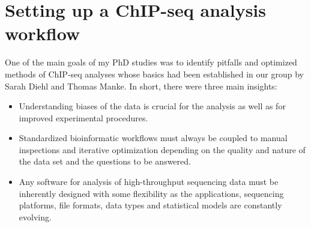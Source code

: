 \section{Setting up a ChIP-seq analysis workflow}
One of the main goals of my PhD studies was to identify pitfalls and optimized methods of ChIP-seq analyses whose basics had been established in our group by Sarah Diehl and Thomas Manke. In short, there were three main insights:
\begin{itemize}[topsep=0pt]
\item Understanding biases of the data is crucial for the analysis as well as for improved experimental procedures.
\item Standardized bioinformatic workflows must always be coupled to manual inspections and iterative optimization depending on the quality and nature of the data set and the questions to be answered.
\item Any software for analysis of high-throughput sequencing data must be inherently designed with some flexibility as the applications, sequencing platforms, file formats, data types and statistical models are constantly evolving.
\end{itemize}
%
